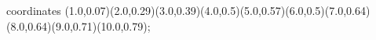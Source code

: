 					coordinates { (1.0,0.07)(2.0,0.29)(3.0,0.39)(4.0,0.5)(5.0,0.57)(6.0,0.5)(7.0,0.64)(8.0,0.64)(9.0,0.71)(10.0,0.79)};